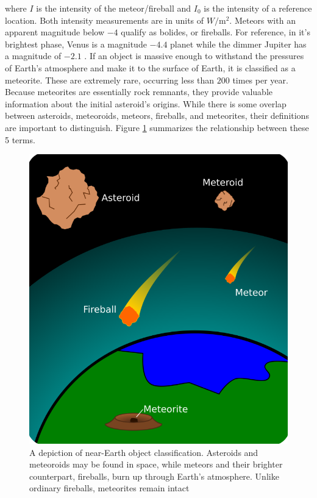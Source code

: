 where $I$ is the intensity of the meteor/fireball and $I_0$ is the intensity of a reference location.  
Both intensity measurements are in units of $\si{W/\meter^2}$.
Meteors with an apparent magnitude below $-4$ qualify as bolides, or fireballs.
For reference, in it's brightest phase, Venus is a magnitude $-4.4$ planet while the dimmer Jupiter has a magnitude of $-2.1$ \cite{rao_venus_nodate}.
If an object is massive enough to withstand the pressures of Earth's atmosphere and make it to the surface of Earth, it is classified as a meteorite. 
These are extremely rare, occurring less than $200$ times per year.
Because meteorites are essentially rock remnants, they provide valuable information about the initial asteroid's origins.
While there is some overlap between asteroids, meteoroids, meteors, fireballs, and meteorites, their definitions are important to distinguish.
Figure \ref{jed} summarizes the relationship between these 5 terms.

\begin{figure}[ht!]
  \centering
  \includegraphics[scale=0.3]{images/jed_zoomedin.png}
  \caption[A depiction of near-Earth object classification.]{A depiction of near-Earth object classification.  Asteroids and meteoroids may be found in space, while meteors and their brighter counterpart, fireballs, burn up through Earth's atmosphere.  Unlike ordinary fireballs, meteorites remain intact }
  \label{jed}
\end{figure}


